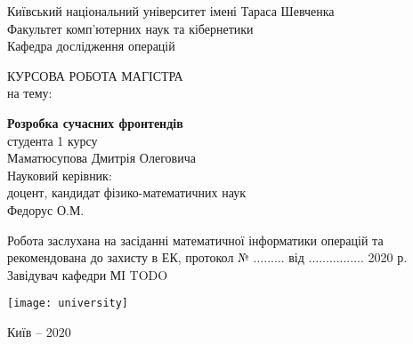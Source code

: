 \begin{titlepage}
    \begin{center}

        Київський національний університет імені Тараса Шевченка\\
        Факультет комп’ютерних наук та кібернетики\\
        Кафедра дослідження операцій\\

        \vspace*{5cm}

        КУРСОВА РОБОТА МАГІСТРА\\
        на тему:\\

        \vspace*{1cm}

        \textbf{Розробка сучасних фронтендів}\\

        \vspace{1.5cm}
        \hspace{6cm}
        студента 1 курсу\\
        \hspace{6cm}
        Маматюсупова Дмитрія Олеговича\\

        \vspace{1.5cm}
        \hspace{6cm}
        Науковий керівник:\\
        \hspace{6cm}
        доцент, кандидат фізико-математичних наук\\
        \hspace{6cm}
        Федорус О.М.\\


        \vspace{3cm}

        Робота заслухана на засіданні математичної інформатики операцій та\\
        рекомендована до захисту в ЕК, протокол № ......... від ................ 2020 р.\\

        \vspace{1cm}
        Завідувач кафедри МІ \hspace{5cm}   TODO

        \vspace{1cm}
        \vfill


        \vspace{0.8cm}

        \texttt{[image: university]}

        Київ -- 2020

    \end{center}
\end{titlepage}
